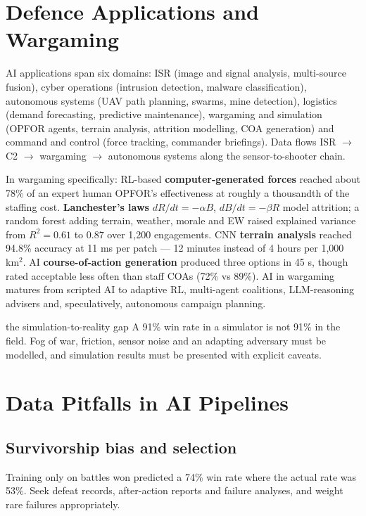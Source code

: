 \documentclass[11pt]{article}
\begin{document}
\section{Defence Applications and Wargaming}
AI applications span six domains: ISR (image and signal analysis, multi-source fusion), cyber operations (intrusion detection, malware classification), autonomous systems (UAV path planning, swarms, mine detection), logistics (demand forecasting, predictive maintenance), wargaming and simulation (OPFOR agents, terrain analysis, attrition modelling, COA generation) and command and control (force tracking, commander briefings). Data flows ISR $\to$ C2 $\to$ wargaming $\to$ autonomous systems along the sensor-to-shooter chain.

In wargaming specifically: RL-based \textbf{computer-generated forces} reached about 78\% of an expert human OPFOR's effectiveness at roughly a thousandth of the staffing cost. \textbf{Lanchester's laws} $dR/dt=-\alpha B$, $dB/dt=-\beta R$ model attrition; a random forest adding terrain, weather, morale and EW raised explained variance from $R^2=0.61$ to $0.87$ over 1,200 engagements. CNN \textbf{terrain analysis} reached 94.8\% accuracy at 11 ms per patch --- 12 minutes instead of 4 hours per 1,000 km$^2$. AI \textbf{course-of-action generation} produced three options in 45 s, though rated acceptable less often than staff COAs (72\% vs 89\%). AI in wargaming matures from scripted AI to adaptive RL, multi-agent coalitions, LLM-reasoning advisers and, speculatively, autonomous campaign planning.
\begin{pitfall}{the simulation-to-reality gap}
A 91\% win rate in a simulator is not 91\% in the field. Fog of war, friction, sensor noise and an adapting adversary must be modelled, and simulation results must be presented with explicit caveats.
\end{pitfall}

\section{Data Pitfalls in AI Pipelines}
\subsection{Survivorship bias and selection}
Training only on battles won predicted a 74\% win rate where the actual rate was 53\%. Seek defeat records, after-action reports and failure analyses, and weight rare failures appropriately.
\end{document}
